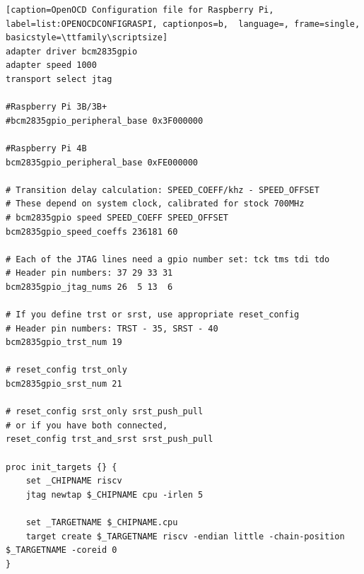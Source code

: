 \begin{lstlisting}[caption=OpenOCD Configuration file for Raspberry Pi, label=list:OPENOCDCONFIGRASPI, captionpos=b,  language=, frame=single, basicstyle=\ttfamily\scriptsize]
adapter driver bcm2835gpio
adapter speed 1000
transport select jtag

#Raspberry Pi 3B/3B+
#bcm2835gpio_peripheral_base 0x3F000000

#Raspberry Pi 4B
bcm2835gpio_peripheral_base 0xFE000000

# Transition delay calculation: SPEED_COEFF/khz - SPEED_OFFSET
# These depend on system clock, calibrated for stock 700MHz
# bcm2835gpio speed SPEED_COEFF SPEED_OFFSET
bcm2835gpio_speed_coeffs 236181 60

# Each of the JTAG lines need a gpio number set: tck tms tdi tdo
# Header pin numbers: 37 29 33 31
bcm2835gpio_jtag_nums 26  5 13  6

# If you define trst or srst, use appropriate reset_config
# Header pin numbers: TRST - 35, SRST - 40
bcm2835gpio_trst_num 19

# reset_config trst_only
bcm2835gpio_srst_num 21

# reset_config srst_only srst_push_pull
# or if you have both connected,
reset_config trst_and_srst srst_push_pull

proc init_targets {} {
    set _CHIPNAME riscv
    jtag newtap $_CHIPNAME cpu -irlen 5

    set _TARGETNAME $_CHIPNAME.cpu
    target create $_TARGETNAME riscv -endian little -chain-position $_TARGETNAME -coreid 0
}
\end{lstlisting}

